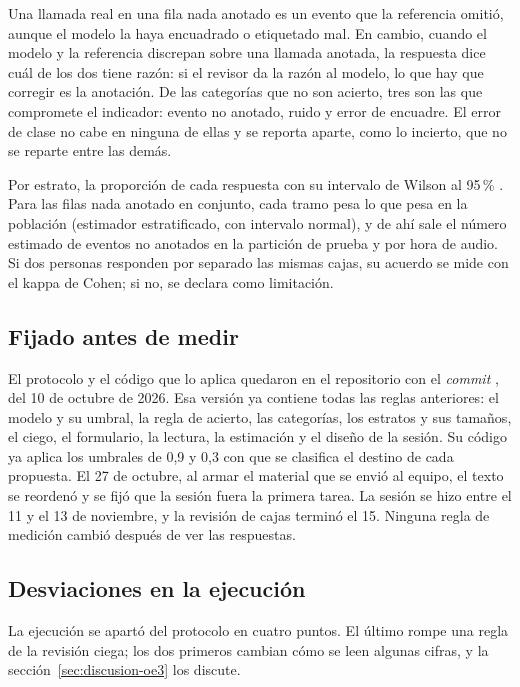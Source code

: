Una llamada real en una fila nada anotado es un evento que la referencia omitió,
aunque el modelo la haya encuadrado o etiquetado mal. En cambio, cuando el modelo
y la referencia discrepan sobre una llamada anotada, la respuesta dice cuál de los
dos tiene razón: si el revisor da la razón al modelo, lo que hay que corregir es la
anotación. De las categorías que no son acierto, tres son las que compromete el
indicador: evento no anotado, ruido y error de encuadre. El error de clase no cabe
en ninguna de ellas y se reporta aparte, como lo incierto, que no se reparte entre
las demás.

 Por estrato, la proporción de cada respuesta con su intervalo
de Wilson al 95\,\% \citep{wilson_probable_1927}. Para las filas nada anotado en conjunto, cada tramo pesa lo
que pesa en la población (estimador estratificado, con intervalo normal), y de ahí
sale el número estimado de eventos no anotados en la partición de prueba y por
hora de audio. Si dos personas responden por separado las mismas cajas, su
acuerdo se mide con el kappa de Cohen; si no, se declara como limitación.

\subsection{Fijado antes de medir}

El protocolo y el código que lo aplica quedaron en el repositorio con el
\textit{commit} , del 10 de octubre de 2026. Esa versión ya contiene
todas las reglas anteriores: el modelo y su umbral, la regla de acierto, las
categorías, los estratos y sus tamaños, el ciego, el formulario, la lectura, la
estimación y el diseño de la sesión. Su código ya aplica los umbrales de 0,9 y 0,3
con que se clasifica el destino de cada propuesta. El 27 de octubre, al armar el
material que se envió al equipo, el texto se reordenó y se fijó que la sesión
fuera la primera tarea. La sesión se hizo entre el 11 y el 13 de noviembre, y la
revisión de cajas terminó el 15. Ninguna regla de medición cambió después de ver
las respuestas.

\subsection{Desviaciones en la ejecución}
\label{sec:desviaciones-oe3}

La ejecución se apartó del protocolo en cuatro puntos. El último rompe una regla
de la revisión ciega; los dos primeros cambian cómo se leen algunas cifras, y la
sección~\ref{sec:discusion-oe3} los discute.

